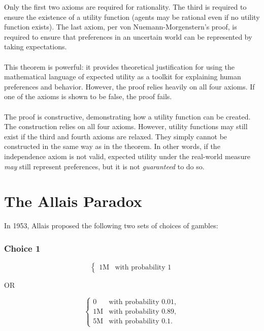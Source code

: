 \documentclass{article}
\begin{document}
Only the first two axioms are required for rationality.  The third is required to ensure the existence of a utility function (agents may be rational even if no utility function exists).  The last axiom, per von Nuemann-Morgenstern's proof, is required to ensure that preferences in an uncertain world can be represented by taking expectations.
\\
\\
This theorem is powerful: it provides theoretical justification for using the mathematical language of expected utility as a toolkit for explaining human preferences and behavior.  However, the proof relies heavily on all four axioms.  If one of the axioms is shown to be false, the proof fails.
\\
\\
The proof is constructive, demonstrating how a utility function can be created.  The construction relies on all four axioms.  However, utility functions may still exist if the third and fourth axioms are relaxed.  They simply cannot be constructed in the same way as in the theorem.  In other words, if the independence axiom is not valid, expected utility under the real-world measure \emph{may} still represent preferences, but it is not \emph{guaranteed} to do so.

\section{The Allais Paradox}

In 1953, Allais proposed the following two sets of choices of gambles:

\subsubsection{Choice 1}

\begin{equation*}
\left\{
\begin{array}{rl}
1\text{M} & \text{with probability } 1
\end{array} \right.
\end{equation*}

OR

\begin{equation*}
\left\{
\begin{array}{rl}
0 & \text{with probability } 0.01,
\\1\text{M} & \text{with probability } 0.89,
\\5\text{M} & \text{with probability } 0.1.
\end{array} \right.
\end{equation*}
\end{document}
